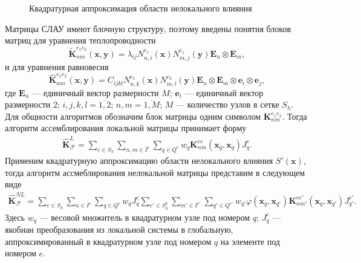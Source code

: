 \begin{figure}[ht]
    \caption{Квадратурная аппроксимация области нелокального влияния}\label{fig:ApproxSQ}
\end{figure}

Матрицы СЛАУ имеют блочную структуру, поэтому введены понятия блоков матриц для уравнения теплопроводности
\[
	\widetilde{\textbf{K}}_{nm}^{e_1 e_2} (\boldsymbol{x}, \boldsymbol{y}) =
	\lambda_{ij} N_{n,i}^{e_1} (\boldsymbol{x}) N_{m,j}^{e_1} (\boldsymbol{y})
	\boldsymbol{E}_n \otimes \boldsymbol{E}_m,
\]
и для уравнения равновесия
\[
	\widehat{\textbf{K}}_{nm}^{e_1 e_2} (\boldsymbol{x}, \boldsymbol{y}) = 
	C_{ijkl} N_{n,k}^{e_1} (\boldsymbol{x}) N_{m,l}^{e_2} (\boldsymbol{y}) \boldsymbol{E}_n \otimes \boldsymbol{E}_m \otimes \boldsymbol{e}_i \otimes \boldsymbol{e}_j,
\]
где $\boldsymbol{E}_n$ --- единичный вектор размерности $M$; $\boldsymbol{e}_i$ --- единичный вектор размерности 2; $i,j,k,l = \overline{1,2}$; $n,m = \overline{1,M}$; $M$ --- количество узлов в сетке $S_h$. Для общности алгоритмов обозначим блок матрицы одним символом $\textbf{K}_{nm}^{e_1 e_2}$. Тогда алгоритм ассемблирования локальной матрицы принимает форму
\begin{gather}
	\label{eq:localMatrix}
	\widehat{\textbf{K}}^L_{\mathcal{F}} =
	\sum\limits_{e \in S_h}
	\sum\limits_{n,m \in I^e}
	\sum\limits_{q \in Q^e}
	w_q \textbf{K}^{ee}_{nm} (\boldsymbol{x}_q, \boldsymbol{x}_q) J_q^e.
\end{gather}
Применим квадратурную аппроксимацию области нелокального влияния $S'(\boldsymbol{x})$, тогда алгоритм ассмеблирования нелокальной матрицы представим в следующем виде
\begin{gather}
	\label{eq:NonlocalMatrix}
	\widehat{\textbf{K}}^{NL}_{\mathcal{F}} =
	\sum\limits_{e \in S_h}
	\sum\limits_{n \in I^e}
	\sum\limits_{q \in Q^e}
	w_q J_q^e
	\sum\limits_{e' \in S_h^q}
	\sum\limits_{m' \in I^{e'}}
	\sum\limits_{q' \in Q^{e'}}
	w_{q'} \varphi(\boldsymbol{x}_q, \boldsymbol{x}_{q'}) 
	\textbf{K}_{nm'}^{e e'}(\boldsymbol{x}_q, \boldsymbol{x}_{q'}) J_{q'}^{e'}.
\end{gather}
Здесь $w_q$ --- весовой множитель в квадратурном узле под номером $q$; $J_q^e$ --- якобиан преобразования из локальной системы в глобальную, аппроксимированный в квадратурном узле под номером $q$ на элементе под номером $e$.

